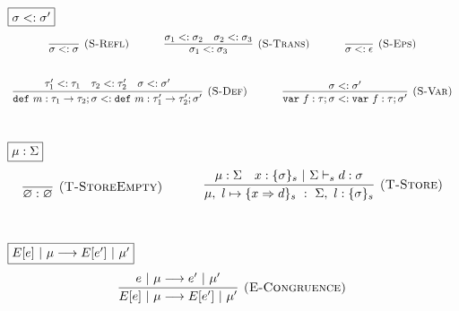 \documentclass{llncs}
\newcommand{\keywadj}[1]{\mathtt{#1}}
\newcommand{\keyw}[1]{\keywadj{#1}~}
\begin{document}
$\fbox{$\sigma <: \sigma'$}$
\[
\begin{array}{c}
\infer[\textsc{(S-Refl)}]
  {\sigma <: \sigma}
  {}%
~~~~~~~~~~
\infer[\textsc{(S-Trans)}]
  {\sigma_1 <: \sigma_3}
  {\sigma_1 <: \sigma_2 & \sigma_2 <: \sigma_3}%
~~~~~~~~~~
\infer[\textsc{(S-Eps)}]
  {\sigma <: \epsilon}
  {}\\[5ex]

\infer[\textsc{(S-Def)}]
  {\keyw{def} m:\tau_1 \rightarrow \tau_2; \sigma <: \keyw{def} m:\tau_1' \rightarrow \tau_2'; \sigma'}
  {\tau_1' <: \tau_1 & \tau_2 <: \tau_2' & \sigma <: \sigma'}%
~~~~~~~~~~
\infer[\textsc{(S-Var)}]
  {\keyw{var} f:\tau; \sigma <: \keyw{var} f:\tau; \sigma'}
  {\sigma <: \sigma'}\\[5ex]  

\end{array}
\]

$\fbox{$\mu : \Sigma$}$
\[
\begin{array}{c}

\infer[\textsc{(T-StoreEmpty)}]
  {\varnothing : \varnothing}
  {}%
~~~~~~~~~~
\infer[\textsc{(T-Store)}]
  {\mu,~l \mapsto \{ x \Rightarrow d \}_s~:~\Sigma,~l : \{ \sigma \}_s}
  {\mu : \Sigma & x : \{ \sigma \}_s~|~\Sigma \vdash_s d : \sigma}\\[5ex]

\end{array}
\]

$\fbox{$E[e]~|~\mu \longrightarrow E[e']~|~\mu'$}$
\[
\begin{array}{c}
\infer[\textsc{(E-Congruence)}]
  {E[e]~|~\mu \longrightarrow E[e']~|~\mu'}
  {e~|~\mu \longrightarrow e'~|~\mu'}\\[5ex]  
\end{array}
\]
\end{document}
